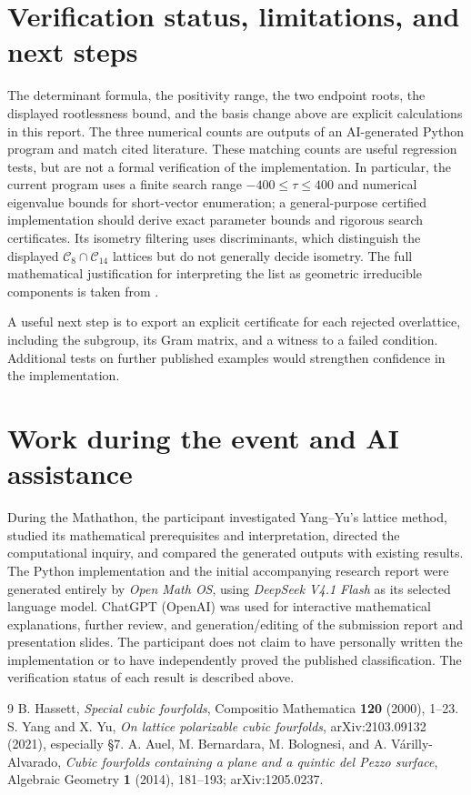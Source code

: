 \documentclass[11pt]{article}
\begin{document}
\section{Verification status, limitations, and next steps}
The determinant formula, the positivity range, the two endpoint roots, the displayed rootlessness bound, and the basis change above are explicit calculations in this report. The three numerical counts are outputs of an AI-generated Python program and match cited literature. These matching counts are useful regression tests, but are not a formal verification of the implementation. In particular, the current program uses a finite search range $-400\le\tau\le400$ and numerical eigenvalue bounds for short-vector enumeration; a general-purpose certified implementation should derive exact parameter bounds and rigorous search certificates. Its isometry filtering uses discriminants, which distinguish the displayed $\mathcal C_8\cap\mathcal C_{14}$ lattices but do not generally decide isometry. The full mathematical justification for interpreting the list as geometric irreducible components is taken from \cite{YangYu,ABBVA}.

A useful next step is to export an explicit certificate for each rejected overlattice, including the subgroup, its Gram matrix, and a witness to a failed condition. Additional tests on further published examples would strengthen confidence in the implementation.

\section{Work during the event and AI assistance}
During the Mathathon, the participant investigated Yang--Yu's lattice method, studied its mathematical prerequisites and interpretation, directed the computational inquiry, and compared the generated outputs with existing results. The Python implementation and the initial accompanying research report were generated entirely by \emph{Open Math OS}, using \emph{DeepSeek V4.1 Flash} as its selected language model. ChatGPT (OpenAI) was used for interactive mathematical explanations, further review, and generation/editing of the submission report and presentation slides. The participant does not claim to have personally written the implementation or to have independently proved the published classification. The verification status of each result is described above.

\begin{thebibliography}{9}
 B. Hassett, \emph{Special cubic fourfolds}, Compositio Mathematica \textbf{120} (2000), 1--23.
 S. Yang and X. Yu, \emph{On lattice polarizable cubic fourfolds}, arXiv:2103.09132 (2021), especially \S7.
 A. Auel, M. Bernardara, M. Bolognesi, and A. V\'arilly-Alvarado, \emph{Cubic fourfolds containing a plane and a quintic del Pezzo surface}, Algebraic Geometry \textbf{1} (2014), 181--193; arXiv:1205.0237.
\end{thebibliography}
\end{document}
